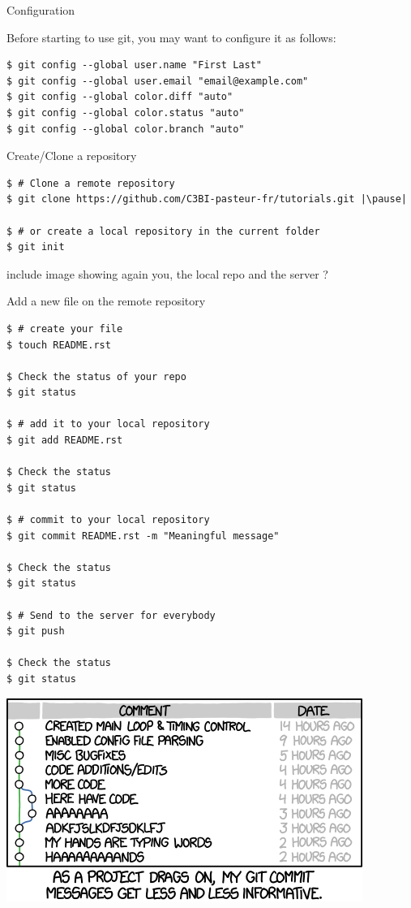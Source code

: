 \begin{frame}[fragile]{Configuration}

Before starting to use git, you may want to configure it as follows:

	\begin{lstlisting}
$ git config --global user.name "First Last"
$ git config --global user.email "email@example.com"
$ git config --global color.diff "auto"
$ git config --global color.status "auto"
$ git config --global color.branch "auto"
	\end{lstlisting}
\end{frame}

\begin{frame}[fragile]{Create/Clone a repository}
	\begin{lstlisting}
$ # Clone a remote repository
$ git clone https://github.com/C3BI-pasteur-fr/tutorials.git |\pause|

$ # or create a local repository in the current folder
$ git init
	\end{lstlisting}
\end{frame}


\begin{frame}
include image showing again you, the local repo and the server ?
\end{frame}


\begin{frame}[fragile]{Add a new file on the remote repository}
\begin{lstlisting}
$ # create your file
$ touch README.rst

$ Check the status of your repo
$ git status

$ # add it to your local repository
$ git add README.rst

$ Check the status 
$ git status

$ # commit to your local repository
$ git commit README.rst -m "Meaningful message"

$ Check the status 
$ git status

$ # Send to the server for everybody
$ git push 

$ Check the status 
$ git status
\end{lstlisting}
\end{frame}

\begin{frame}
\includegraphics[height=0.9\textheight, width=\textwidth]{images/git_commit}
\end{frame}


